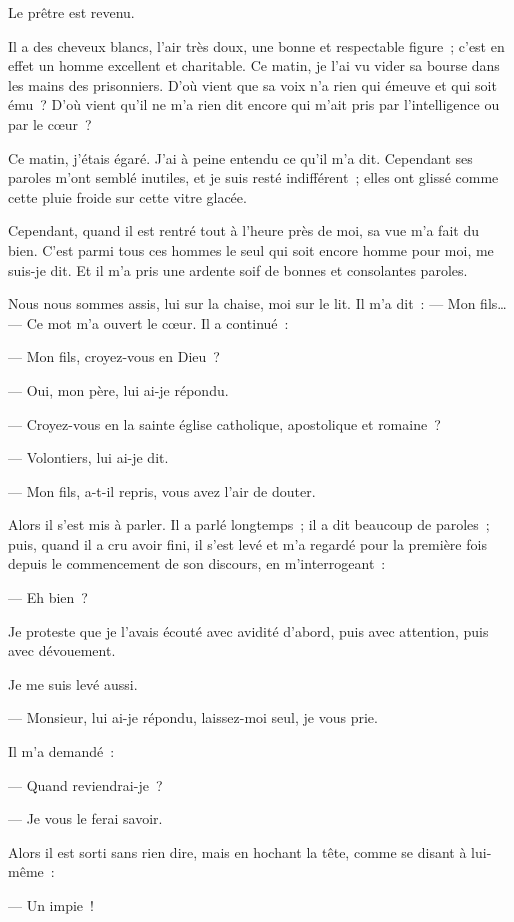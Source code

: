 \documentclass[french,twoside]{book} %
\begin{document}
\noindent Le prêtre est revenu.\par
Il a des cheveux blancs, l’air très doux, une bonne et respectable figure ; c’est en effet un homme excellent et charitable. Ce matin, je l’ai vu vider sa bourse dans les mains des prisonniers. D’où vient que sa voix n’a rien qui émeuve et qui soit ému ? D’où vient qu’il ne m’a rien dit encore qui m’ait pris par l’intelligence ou par le cœur ?\par
Ce matin, j’étais égaré. J’ai à peine entendu ce qu’il m’a dit. Cependant ses paroles m’ont semblé inutiles, et je suis resté indifférent ; elles ont glissé comme cette pluie froide sur cette vitre glacée.\par
Cependant, quand il est rentré tout à l’heure près de moi, sa vue m’a fait du bien. C’est parmi tous ces hommes le seul qui soit encore homme pour moi, me suis-je dit. Et il m’a pris une ardente soif de bonnes et consolantes paroles.\par
Nous nous sommes assis, lui sur la chaise, moi sur le lit. Il m’a dit : — Mon fils… — Ce mot m’a ouvert le cœur. Il a continué :\par
— Mon fils, croyez-vous en Dieu ?\par
— Oui, mon père, lui ai-je répondu.\par
 — Croyez-vous en la sainte église catholique, apostolique et romaine ?\par
— Volontiers, lui ai-je dit.\par
— Mon fils, a-t-il repris, vous avez l’air de douter.\par
Alors il s’est mis à parler. Il a parlé longtemps ; il a dit beaucoup de paroles ; puis, quand il a cru avoir fini, il s’est levé et m’a regardé pour la première fois depuis le commencement de son discours, en m’interrogeant :\par
— Eh bien ?\par
Je proteste que je l’avais écouté avec avidité d’abord, puis avec attention, puis avec dévouement.\par
Je me suis levé aussi.\par
— Monsieur, lui ai-je répondu, laissez-moi seul, je vous prie.\par
Il m’a demandé :\par
— Quand reviendrai-je ?\par
— Je vous le ferai savoir.\par
Alors il est sorti sans rien dire, mais en hochant la tête, comme se disant à lui-même :\par
— Un impie !\par
\end{document}
